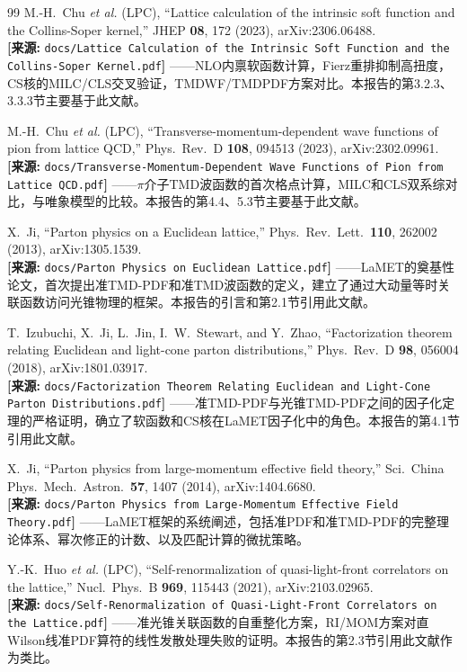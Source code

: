 \documentclass[12pt,a4paper]{ctexart}
\theoremstyle{definition}
\begin{document}
\begin{thebibliography}{99}
M.-H.~Chu \textit{et al.} (LPC),
``Lattice calculation of the intrinsic soft function and the Collins-Soper kernel,''
JHEP \textbf{08}, 172 (2023), arXiv:2306.06488.
\\\textbf{[来源:} \texttt{docs/Lattice Calculation of the Intrinsic Soft Function and the Collins-Soper Kernel.pdf}\textbf{]}
——NLO内禀软函数计算，Fierz重排抑制高扭度，CS核的MILC/CLS交叉验证，TMDWF/TMDPDF方案对比。本报告的第3.2.3、3.3.3节主要基于此文献。

M.-H.~Chu \textit{et al.} (LPC),
``Transverse-momentum-dependent wave functions of pion from lattice QCD,''
Phys.\ Rev.\ D \textbf{108}, 094513 (2023), arXiv:2302.09961.
\\\textbf{[来源:} \texttt{docs/Transverse-Momentum-Dependent Wave Functions of Pion from Lattice QCD.pdf}\textbf{]}
——$\pi$介子TMD波函数的首次格点计算，MILC和CLS双系综对比，与唯象模型的比较。本报告的第4.4、5.3节主要基于此文献。

X.~Ji,
``Parton physics on a Euclidean lattice,''
Phys.\ Rev.\ Lett.\ \textbf{110}, 262002 (2013), arXiv:1305.1539.
\\\textbf{[来源:} \texttt{docs/Parton Physics on Euclidean Lattice.pdf}\textbf{]}
——LaMET的奠基性论文，首次提出准TMD-PDF和准TMD波函数的定义，建立了通过大动量等时关联函数访问光锥物理的框架。本报告的引言和第2.1节引用此文献。

T.~Izubuchi, X.~Ji, L.~Jin, I.~W.~Stewart, and Y.~Zhao,
``Factorization theorem relating Euclidean and light-cone parton distributions,''
Phys.\ Rev.\ D \textbf{98}, 056004 (2018), arXiv:1801.03917.
\\\textbf{[来源:} \texttt{docs/Factorization Theorem Relating Euclidean and Light-Cone Parton Distributions.pdf}\textbf{]}
——准TMD-PDF与光锥TMD-PDF之间的因子化定理的严格证明，确立了软函数和CS核在LaMET因子化中的角色。本报告的第4.1节引用此文献。

X.~Ji,
``Parton physics from large-momentum effective field theory,''
Sci.\ China Phys.\ Mech.\ Astron.\ \textbf{57}, 1407 (2014), arXiv:1404.6680.
\\\textbf{[来源:} \texttt{docs/Parton Physics from Large-Momentum Effective Field Theory.pdf}\textbf{]}
——LaMET框架的系统阐述，包括准PDF和准TMD-PDF的完整理论体系、幂次修正的计数、以及匹配计算的微扰策略。

Y.-K.~Huo \textit{et al.} (LPC),
``Self-renormalization of quasi-light-front correlators on the lattice,''
Nucl.\ Phys.\ B \textbf{969}, 115443 (2021), arXiv:2103.02965.
\\\textbf{[来源:} \texttt{docs/Self-Renormalization of Quasi-Light-Front Correlators on the Lattice.pdf}\textbf{]}
——准光锥关联函数的自重整化方案，RI/MOM方案对直Wilson线准PDF算符的线性发散处理失败的证明。本报告的第2.3节引用此文献作为类比。


\end{thebibliography}
\end{document}
